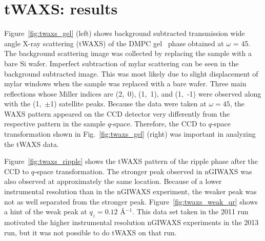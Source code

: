 



\newpage
\section{tWAXS: results}\label{sec:tWAXS_results}
Figure~\ref{fig:twaxs_gel} (left) shows background subtracted transmission wide
angle X-ray scattering (tWAXS) of the DMPC gel \LbetaI\ phase obtained at 
$\omega$ = 45\textdegree.
The background scattering image was collected by replacing 
the sample with a bare Si wafer. Imperfect subtraction of mylar scattering 
can be seen in the background subtracted image. 
This was most likely due to slight displacement of mylar windows
when the sample was replaced with a bare wafer. 
Three main reflections whose Miller indices 
are (2,~0), (1,~1), and (1,~-1) were observed along with the (1,~$\pm$1) satellite 
peaks.
Because the data were taken at $\omega=45$\textdegree, the WAXS pattern 
appeared on the CCD detector very differently from the respective pattern
in the sample $q$-space. 
Therefore, the CCD to $q$-space transformation shown in 
Fig.~\ref{fig:twaxs_gel} (right) was important in analyzing the tWAXS data. 

Figure~\ref{fig:twaxs_ripple} shows the tWAXS pattern of the ripple phase 
after the CCD to $q$-space transformation. The stronger
peak observed in nGIWAXS was also observed at approximately the same location.
Because of a lower instrumental resolution than in the nGIWAXS experiment,
the weaker peak was not as well separated from the stronger peak. 
Figure~\ref{fig:twaxs_weak_qr} shows
a hint of the weak peak at $q_z=0.12$ \AA$^{-1}$. This
data set taken in the 2011 run motivated
the higher instrumental resolution nGIWAXS experiments
in the 2013 run, but it was not possible to do tWAXS on that run.

